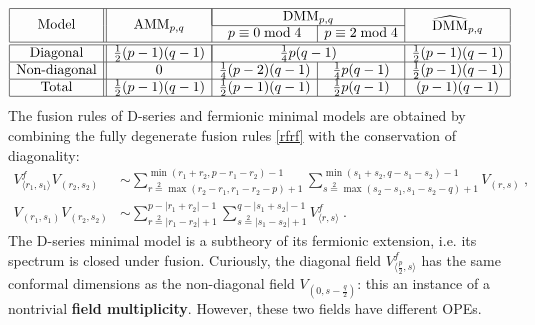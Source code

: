 \documentclass[12pt, a4paper]{article}
\newcommand{\myindex}[1]{\textbf{\boldmath #1}}
\theoremstyle{break}
\begin{document}
\begin{align}
 \begin{array}{|c||c|c|c|c|}
 \hline 
  \multirow{2}{*}{Model} & \multirow{2}{*}{AMM$_{p,q}$} & \multicolumn{2}{|c|}{\text{DMM}_{p,q}} 
   & \multirow{2}{*}{$\widehat{\text{DMM}}_{p,q}$}
  \\
  \cline{3-4}
  & & p\equiv 0\bmod 4 & p\equiv 2\bmod 4 & 
  \\
  \hline \hline 
  \text{Diagonal} & \frac12(p-1)(q-1) & \multicolumn{2}{|c|}{\frac14 p(q-1)} & \frac12 (p-1)(q-1) 
  \\
  \hline 
  \text{Non-diagonal} & 0  & \frac14(p-2)(q-1) &
  \frac14p(q-1) 
  & \frac12 (p-1)(q-1) 
  \\
  \hline 
  \text{Total} & \frac12(p-1)(q-1) & 
   \frac12(p-1)(q-1) &
  \frac12 p(q-1) & (p-1)(q-1)
  \\
  \hline 
 \end{array}
\end{align}
The fusion rules of D-series and fermionic minimal models are obtained by combining the fully degenerate fusion rules \eqref{rfrf} with the conservation of diagonality:
\begin{align}
 V^f_{\langle r_1,s_1\rangle}V_{(r_2,s_2)} &\sim \sum_{r\overset{2}{=}\max(r_2-r_1,r_1-r_2-p)+1}^{\min(r_1+r_2,p-r_1-r_2)-1} \sum_{s\overset{2}{=}\max(s_2-s_1,s_1-s_2-q)+1}^{\min(s_1+s_2,q-s_1-s_2)-1} V_{(r,s)} \ ,
 \label{vfvn}
 \\
 V_{(r_1,s_1)} V_{(r_2,s_2)} & \sim \sum_{r\overset{2}{=}|r_1-r_2|+1}^{p-|r_1+r_2|-1} \sum_{s\overset{2}{=}|s_1-s_2|+1}^{q-|s_1+s_2|-1} V^f_{\langle r,s\rangle}\ . 
 \label{vnvn}
\end{align}
The D-series minimal model is a subtheory of its fermionic extension, i.e. its spectrum is closed under fusion. Curiously, the diagonal field $V^f_{\langle \frac{p}{2}, s\rangle}$ has the same conformal dimensions as the non-diagonal field $V_{(0,s-\frac{q}{2})}$: this an instance of a nontrivial \myindex{field multiplicity}. However, these two fields have different OPEs. 
\end{document}
